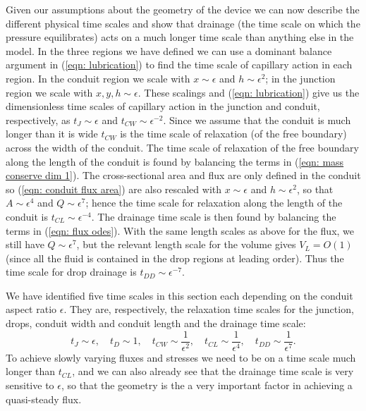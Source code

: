 \documentclass{jfm}
\begin{document}
  
 
Given our assumptions about the geometry of the device  we can now describe the different physical  time scales and show that drainage (the time scale on which the pressure equilibrates) acts on a  much  longer time scale than anything else in the model.
 In the three regions we have defined  we can use a dominant balance argument in (\ref{eqn: lubrication}) to  find  the time scale of capillary action in each region. 
In  the  conduit  region we scale with     $x \sim\epsilon$ and $h \sim \epsilon^2$;  in the junction region we scale with   $x,y,h \sim \epsilon$.
These scalings and (\ref{eqn: lubrication}) give  us the dimensionless  time scales of capillary action in the junction  and  conduit, respectively, as $t_J\sim \epsilon$  and $t_{CW}\sim\epsilon^{-2}  $.  
Since we  assume that the  conduit  is much longer than it is wide $t_{CW}$ is the time scale of relaxation  (of the free boundary) across the width of the conduit.
The time scale of relaxation of the free boundary along the length of the conduit is found by balancing the terms in (\ref{eqn: mass conserve dim 1}).
The cross-sectional area and flux are only defined in the conduit so  (\ref{eqn:  conduit  flux area}) are also  rescaled with  $x \sim\epsilon$ and  $h \sim \epsilon^2$,  so that  $A \sim \epsilon^4$  and $Q \sim \epsilon^7$; hence    the time scale for relaxation along the length of the conduit is $t_{CL} \sim \epsilon^{-4}  $. 
The drainage time scale is then found by balancing the terms in  (\ref{eqn: flux odes}).
With  the same length scales as above for the flux,  we still  have $Q \sim \epsilon^7$, but the relevant length scale for the volume gives $ V_L =O(1)$ (since all the fluid is contained in the drop regions at leading order).
Thus the time scale for drop drainage is $ t_{DD} \sim \epsilon^{-7}$.


We have identified five time scales in this section each depending on the conduit aspect ratio $\epsilon$. 
They are, respectively,  the relaxation time scales for the junction,  drops,  conduit width and  conduit length and the drainage time scale:
  \label{eqn: time scales} 
 \begin{equation}
t_{J} \sim \epsilon  , \quad  t_{D} \sim 1, \quad    t_{CW}\sim \frac{1}{\epsilon^2}, \quad  t_{CL} \sim \frac{1}{\epsilon^4}  , \quad t_{DD}\sim \frac{1}{\epsilon^7}.  \tag{\theequation a--e}
 \end{equation}
To achieve slowly varying fluxes and stresses we need to be on a time scale much longer than $t_{CL}$, and  we can also  already see that the drainage time scale is very sensitive to $\epsilon$, so that the geometry is the a very  important factor in achieving a quasi-steady flux.
\end{document}
